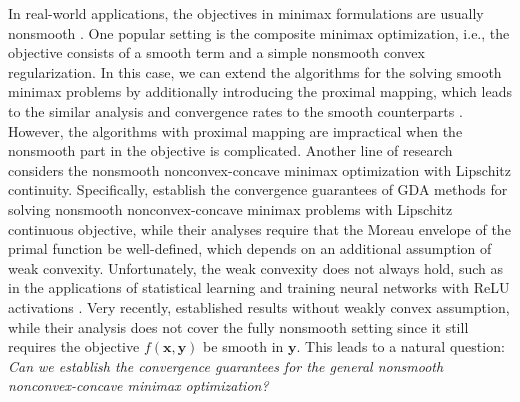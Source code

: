 \documentclass[11pt]{article}
\def\vx{\mathbf{x}}
\def\vy{\mathbf{y}}
\begin{document}
In real-world applications, the objectives in minimax formulations are usually nonsmooth
\citep{madry2018towards, rahimian2019distributionally, jiang2023optimality, sinha2017certifying}.
One popular setting is the composite minimax optimization, i.e., the objective consists of a smooth term and a simple nonsmooth convex regularization. 
In this case, we can extend the algorithms for the solving smooth minimax problems by additionally introducing the proximal mapping, which leads to the similar analysis and convergence rates to the smooth counterparts \citep{lu2020hybrid,zhao2024primal,barazandeh2020solving,huang2021efficient,zhang2024robust}.
However, the algorithms with proximal mapping are impractical when the nonsmooth part in the objective is complicated.
Another line of research considers 
the nonsmooth nonconvex-concave minimax optimization with Lipschitz continuity.
Specifically, \citet{lin2025two,boct2023alternating} establish the convergence guarantees of GDA methods for solving nonsmooth nonconvex-concave minimax problems with Lipschitz continuous objective, 
while their analyses require that the Moreau envelope \citep{moreau1965proximite} of the primal function be well-defined, which depends on an additional assumption of weak convexity.
Unfortunately, the weak convexity does not always hold,
such as in the applications of statistical learning \citep{fan2001variable,zhang2006gene,zhang2010nearly,mazumder2011sparsenet,zhang2010analysis} and training neural networks with ReLU activations \citep{nair2010rectified,zhang2020complexity}.
Very recently, \citet{masiha2026zeroth} established results without weakly convex assumption, while their analysis does not cover the fully nonsmooth setting since it still requires the objective $f(\vx,\vy)$ be smooth in $\vy$.
This leads to a natural question: \emph{Can we establish the convergence guarantees for the general nonsmooth nonconvex-concave minimax optimization?}
\end{document}
